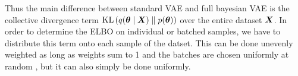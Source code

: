 Thus the main difference between standard VAE and full bayesian VAE is the collective divergence term $\operatorname{KL}{\mathopen{} \left(q(\bm{ \theta } \mid \bm{ X }) \parallel p(\bm{ \theta })\right) \mathclose{}}$ over the entire dataset $\bm{ X }$. In order to determine the ELBO on individual or batched samples, we have to distribute this term onto each sample of the datset. This can be done unevenly weighted as long as weights sum to 1 and the batches are chosen uniformly at random \cite{blundell2015weight}, but it can also simply be done uniformly.